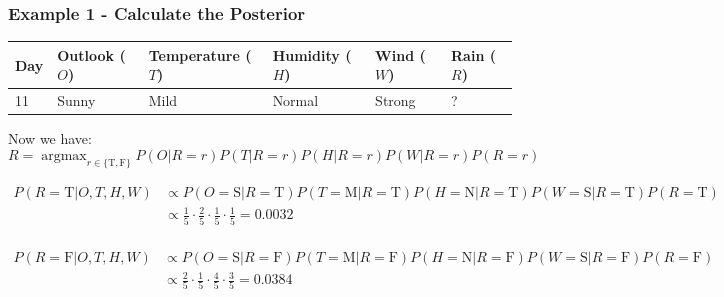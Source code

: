 \documentclass[aspectratio=169, 10pt]{beamer}
\DeclareMathOperator*{\argmax}{argmax}
\begin{document}
\begin{frame}[t]
    \frametitle{Example 1 - Calculate the Posterior}
    \begin{table}[]
        \small
        \begin{tabular}{l|llll|l}
        \textbf{Day} & \textbf{Outlook} ($O$) & \textbf{Temperature} ($T$) & \textbf{Humidity} ($H$) & \textbf{Wind} ($W$) & \textbf{Rain} ($R$) \\ \hline
        11           & Sunny            & Mild                 & Normal            & Strong        & ?            
        \end{tabular}
    \end{table}

    Now we have:
    \[ R = \argmax_{r \in \{\text{T}, \text{F}\}} P(O| R=r)P(T| R=r)P(H| R=r)P(W| R=r) P(R=r) \]

    \begin{align*}
        P(R=\text{T}|O,T,H,W) & \propto P(O=\text{S}| R=\text{T})P(T=\text{M}| R=\text{T})P(H=\text{N}| R=\text{T})P(W=\text{S}| R=\text{T}) P(R=\text{T}) \\
        & \propto \frac{1}{5} \cdot \frac{2}{5} \cdot \frac{1}{5} \cdot \frac{1}{5} = 0.0032\\
    \end{align*}

    \begin{align*}
        P(R=\text{F}|O,T,H,W) & \propto P(O=\text{S}| R=\text{F})P(T=\text{M}| R=\text{F})P(H=\text{N}| R=\text{F})P(W=\text{S}| R=\text{F}) P(R=\text{F}) \\
        & \propto \frac{2}{5} \cdot \frac{1}{5} \cdot \frac{4}{5} \cdot \frac{3}{5} = 0.0384\\
    \end{align*}
\end{frame}
\end{document}
